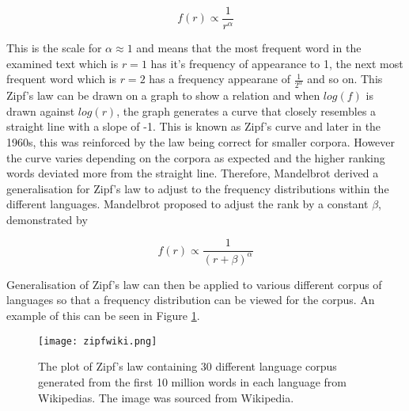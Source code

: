 \begin{equation}\label{eq:zipfs}
f(r) \propto \frac{1}{r^{\alpha}}
\end{equation}

This is the scale for $\alpha \approx 1$ and means that the most frequent word in the examined text which is $r = 1$ has it's frequency of appearance to 1, the next most frequent word which is $r = 2$ has a frequency appearane of $\frac{1}{2^{\alpha}}$ and so on. This Zipf's law can be drawn on a graph to show a relation and when $log(f)$ is drawn against $log(r)$, the graph generates a curve that closely resembles a straight line with a slope of -1. This is known as Zipf's curve and later in the 1960s, this was reinforced by the law being correct for smaller corpora\cite{sicilia2002extension}. However the curve varies depending on the corpora as expected and the higher ranking words deviated more from the straight line. Therefore, Mandelbrot derived a generalisation for Zipf's law to adjust to the frequency distributions within the different languages. Mandelbrot proposed to adjust the rank by a constant $\beta$, demonstrated by

\begin{equation}\label{eq:zipfs}
f(r) \propto \frac{1}{(r + \beta)^{\alpha}}
\end{equation}

Generalisation of Zipf's law can then be applied to various different corpus of languages so that a frequency distribution can be viewed for the corpus. An example of this can be seen in Figure \ref{fig:zipfwiki}.

\begin{figure}[!htb]
	\centering
	\texttt{[image: zipfwiki.png]}
	\caption{The plot of Zipf's law containing 30 different language corpus generated from the first 10 million words in each language from Wikipedias. The image was sourced from Wikipedia\cite{zipffigure}. }
	\label{fig:zipfwiki}
\end{figure}

